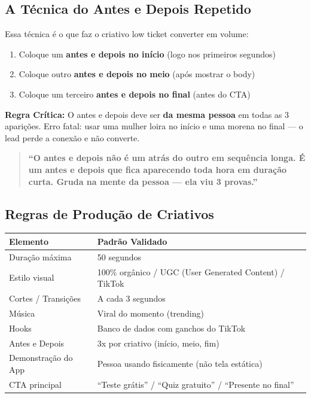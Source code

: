 \documentclass[12pt, a4paper]{article}
\begin{document}
\subsection{A Técnica do Antes e Depois Repetido}

Essa técnica é o que faz o criativo low ticket converter em volume:

\begin{enumerate}
    \item Coloque um \textbf{antes e depois no início} (logo nos primeiros segundos)
    \item Coloque outro \textbf{antes e depois no meio} (após mostrar o body)
    \item Coloque um terceiro \textbf{antes e depois no final} (antes do CTA)
\end{enumerate}

\textcolor{accentColor}{\textbf{Regra Crítica:}} O antes e depois deve ser \textbf{da mesma pessoa} em todas as 3 aparições. Erro fatal: usar uma mulher loira no início e uma morena no final --- o lead perde a conexão e não converte.

\begin{quote}
\textcolor{primaryColor}{\textbf{``O antes e depois não é um atrás do outro em sequência longa. É um antes e depois que fica aparecendo toda hora em duração curta. Gruda na mente da pessoa --- ela viu 3 provas.''}}
\end{quote}

\needspace{8cm}

\subsection{Regras de Produção de Criativos}

\begin{table}[H]
    \centering
    \renewcommand{\arraystretch}{1.4}
    \begin{tabularx}{\textwidth}{X X}
        \toprule
        \rowcolor{tableHeader} \textbf{Elemento} & \textbf{Padrão Validado} \\
        \midrule
        Duração máxima & 50 segundos \\
        \rowcolor{lightGray}
        Estilo visual & 100\% orgânico / UGC (User Generated Content) / TikTok \\
        Cortes / Transições & A cada 3 segundos \\
        \rowcolor{lightGray}
        Música & Viral do momento (trending) \\
        Hooks & Banco de dados com ganchos do TikTok \\
        \rowcolor{lightGray}
        Antes e Depois & 3x por criativo (início, meio, fim) \\
        Demonstração do App & Pessoa usando fisicamente (não tela estática) \\
        \rowcolor{lightGray}
        CTA principal & ``Teste grátis'' / ``Quiz gratuito'' / ``Presente no final'' \\
        \bottomrule
    \end{tabularx}
\end{table}
\end{document}
